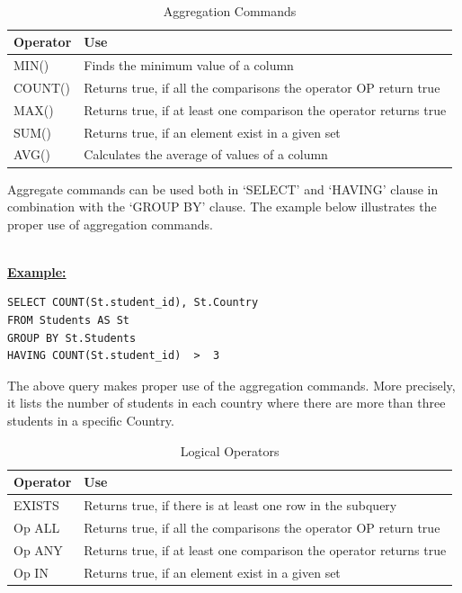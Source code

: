 \hfill\\
\begin{table}[h]
\centering
\caption{Aggregation Commands}
\label{my-label}
\begin{tabular}{|p{2cm}|p{11.5cm}| }
\hline
 \textbf{Operator}  &  \textbf{Use}                                                    \\ \hline
MIN()               & Finds the minimum value of a column                                \\ \hline
COUNT()             & Returns true, if all the comparisons the operator OP return true   \\ \hline
MAX()               & Returns true, if at least one comparison the operator returns true \\ \hline
SUM()               & Returns true, if an element exist in a given set                   \\ \hline
AVG()               & Calculates the average of values of a column                       \\ \hline
\end{tabular}
\end{table}

Aggregate commands can be used both in ‘SELECT’ and ‘HAVING’ clause in combination with the ‘GROUP BY’ clause. The example below illustrates the proper use of aggregation commands.

\hfill\\
\noindent\textbf{\underline{Example:}}
\begin{mdframed}[backgroundcolor=lightgray!20] 
\begin{lstlisting}[style=SQL]
SELECT COUNT(St.student_id), St.Country
FROM Students AS St 
GROUP BY St.Students
HAVING COUNT(St.student_id)  >  3
\end{lstlisting}
\end{mdframed}

The above query makes proper use of the aggregation commands. More precisely, it lists the number of students in each country where there are more than three students in a specific Country. 

\begin{table}[h]
\centering
\caption{Logical  Operators}
\label{my-label}
\begin{tabular}{|p{2cm}|p{11.5cm}| }
\hline
\textbf{Operator} & \textbf{Use}                                                     \\ \hline
EXISTS            & Returns true, if there is at least one row in the subquery         \\ \hline
Op ALL            & Returns true, if all the comparisons the operator OP return true   \\ \hline
Op ANY            & Returns true, if at least one comparison the operator returns true \\ \hline
Op IN             & Returns true, if an element exist in a given set                   \\ \hline
\end{tabular}
\end{table}

